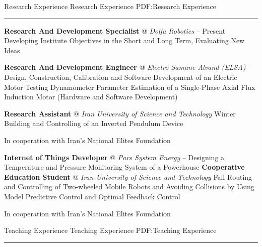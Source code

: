 \documentclass[letterpaper,MMMyyyy]{CVTemplate}
\begin{document}
\begin{Body}
\Section
{Research Experience}
{Research Experience}
{PDF:Research Experience}
\textcolor{Forestg}{\vspace{0.10cm}\hrule height 0.1cm}\BigGap\Gap\Gap
\Entry
\textbf{Research And Development Specialist} @ \textit{Dolfa Robotics}
\hfill
\textcolor{OrangeY}{ – Present}
\Gap
\BulletItem
Developing Institute Objectives in the Short and Long Term, Evaluating New Ideas

\Entry
\vspace{6pt}
\textbf{Research And Development Engineer} @ \textit{Electro Samane Alvand (ELSA)}
\hfill
\textcolor{OrangeY}{ – }
\Gap
\BulletItem
Design, Construction, Calibration and Software Development of an Electric Motor Testing Dynamometer 
\BulletItem
Parameter Estimation of a Single-Phase Axial Flux Induction Motor (Hardware and Software Development) 


\Entry
\vspace{6pt}
\textbf{Research Assistant} @ \textit{Iran University of Science and Technology}
\hfill
\textcolor{OrangeY}{Winter }
\Gap
\BulletItem
Building and Controlling of an Inverted Pendulum Device
\begin{Detail}
	\qquad In cooperation with Iran's National Elites Foundation
\end{Detail}


\Entry
\vspace{6pt}
\textbf{Internet of Things Developer} @ \textit{Pars System Energy}
\hfill
\textcolor{OrangeY}{\textcolor{OrangeY}{ –
}}
\Gap
\BulletItem
Designing a Temperature and Pressure Monitoring System of a Powerhouse
\Entry
\vspace{6pt}
\textbf{Cooperative Education Student} @ \textit{Iran University of Science and Technology}
\hfill
\textcolor{OrangeY}{Fall }
\Gap
\BulletItem
Routing and Controlling of Two-wheeled Mobile Robots and Avoiding Collisions by Using Model Predictive Control and Optimal Feedback Control
\begin{Detail}
	\qquad In cooperation with Iran's National Elites Foundation
\end{Detail}
\vspace{15pt}

\Section
{Teaching Experience}
{Teaching Experience}
{PDF:Teaching Experience}
\textcolor{Forestg}{\vspace{0.10cm}\hrule height 0.1cm}\BigGap\Gap


\end{Body}
\end{document}
